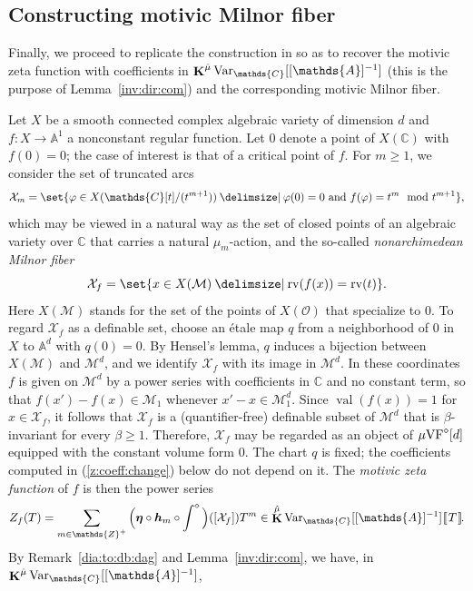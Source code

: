 \documentclass[12pt]{amsart}
\newcommand{\memph}[1]{{\color{magenta}\emph{#1}}}
\theoremstyle{plain}
\theoremstyle{definition}
\theoremstyle{remark}
\numberwithin{equation}{section}
\theoremstyle{plain}
\newcommand{\VF}{\textup{VF}}
\newcommand{\MM}{\mdl M}
\newcommand{\OO}{\mdl O}
\newcommand{\Z}{\mathds{Z}}
\newcommand{\A}{\mathds{A}}
\newcommand{\C}{\mathds{C}}
\newcommand{\0}{\emptyset}
\newcommand{\dbra}[1]{%
  \,[\mkern-6.8mu[\, #1 \,]\mkern-6.8mu]}
\newcommand{\mdl}[1]{\mathcal{#1}}  %
\newcommand{\fun}{\longrightarrow}
\providecommand\given{}
\newcommand\SetSymbol[1][]{%
\nonscript \: #1 \vert
\allowbreak
\nonscript\:
\mathopen{}}
\renewcommand\given{\SetSymbol[\delimsize]}
\newcommand{\mgVF}{{\mu} {\VF}}
\DeclareMathOperator{\rv}{rv}
\DeclareMathOperator{\vv}{val}
\DeclareMathOperator{\ggk}{\mathbf{K}}
\newcommand{\var}{\textup{Var}}
\newcommand{\gmv}{\ggk^{\hat \mu}\var_{\C}}
\begin{document}
\subsection{Constructing motivic Milnor fiber}\label{sec:milnor}

Finally, we proceed to replicate the construction in \cite[\S~8]{hru:loe:lef} so as to recover the motivic zeta function with coefficients in $\gmv[[\A]^{-1}]$ (this is the purpose of Lemma~\ref{inv:dir:com}) and the corresponding motivic Milnor fiber.


Let $X$ be a smooth connected complex algebraic variety of dimension $d$ and $f : X \fun \A^1$ a nonconstant regular function. Let $0$ denote a point of $X(\C)$ with $f(0) = 0$; the case of interest is that of a critical point of $f$. For $m \geq 1$, we consider the set of truncated arcs
\begin{equation}\label{f:m:arc}
\mdl X_{m} = \set{ \varphi \in X(\C[t] / (t^{m+1})) \given \varphi(0) = 0 \text{ and } f(\varphi) = t^m \mod t^{m+1}},
\end{equation}
which may be viewed in a natural way as the set of closed points of an algebraic variety over $\C$ that carries a natural $\mu_{m}$-action, and the so-called \memph{nonarchimedean Milnor fiber}
\[
\mdl X_f = \set{ x \in X(\MM) \given \rv(f(x)) = \rv(t)}.
\]
Here $X(\MM)$ stands for the set of the points of $X(\OO)$ that specialize to $0$. To regard $\mdl X_f$ as a definable set, choose an \'etale map $q$ from a neighborhood of $0$ in $X$ to $\A^d$ with $q(0) = 0$. By Hensel's lemma, $q$ induces a bijection between $X(\MM)$ and $\MM^d$, and we identify $\mdl X_f$ with its image in $\MM^d$. In these coordinates $f$ is given on $\MM^d$ by a power series with coefficients in $\C$ and no constant term, so that $f(x') - f(x) \in \MM_1$ whenever $x' - x \in \MM_1^d$. Since $\vv(f(x)) = 1$ for $x \in \mdl X_f$, it follows that $\mdl X_f$ is a (quantifier-free) definable subset of $\MM^d$ that is $\beta$-invariant for every $\beta \geq 1$. Therefore, $\mdl X_f$ may be regarded as an object of $\mgVF^\diamond[d]$ equipped with the constant volume form $0$. The chart $q$ is fixed; the coefficients computed in (\ref{z:coeff:change}) below do not depend on it. The  \memph{motivic zeta function} of $f$ is then the power series
\begin{equation}\label{def:zeta}
Z_f(T) = \sum_{m \in \Z^+} \Big(\bm \eta \circ \bm h_m \circ \int^{\diamond} \Big)([\mdl X_f]) T^m \in \gmv[[\A]^{-1}] \dbra T.
\end{equation}
By Remark~\ref{dia:to:db:dag} and Lemma~\ref{inv:dir:com}, we have, in $\gmv[[\A]^{-1}]$,
\end{document}
